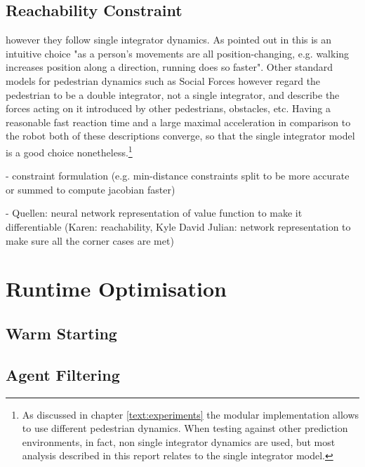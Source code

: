 \subsection{Reachability Constraint}
\label{text:approach/constraint/reachability}

however they follow single integrator dynamics. As pointed out in \cite{Ivanovic18} this is an intuitive choice "as a person’s movements are all position-changing, e.g. walking increases position along a direction, running does so faster". Other standard models for pedestrian dynamics such as Social Forces \cite{Helbling1995} however regard the pedestrian to be a double integrator, not a single integrator, and describe the forces acting on it introduced by other pedestrians, obstacles, etc. Having a reasonable fast reaction time and a large maximal acceleration in comparison to the robot both of these descriptions converge, so that the single integrator model is a good choice nonetheless.\footnote{As discussed in chapter \ref{text:experiments} the modular implementation allows to use different pedestrian dynamics. When testing against other prediction environments, in fact, non single integrator dynamics are used, but most analysis described in this report relates to the single integrator model.} 

- constraint formulation (e.g. min-distance constraints split to be more accurate or summed to compute jacobian faster)

- Quellen: neural network representation of value function to make it differentiable (Karen: reachability, Kyle David Julian: network representation to make sure all the corner cases are met)

\section{Runtime Optimisation}
\label{text:approach/runtime}

\subsection{Warm Starting}
\label{text:approach/runtime/warm_starting}

\subsection{Agent Filtering}
\label{text:approach/runtime/filtering}

